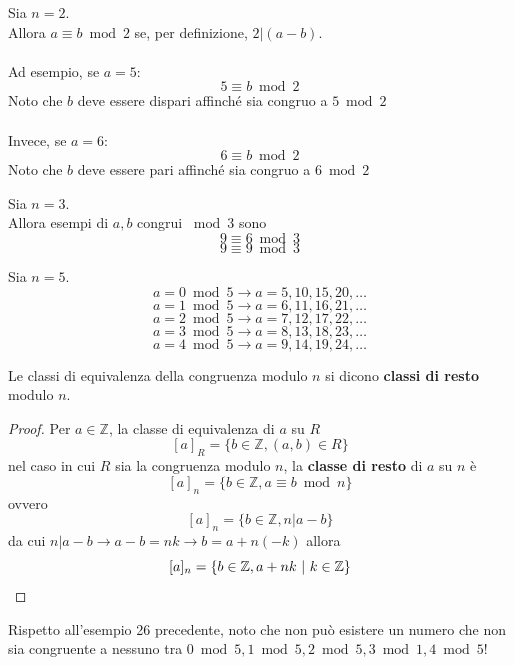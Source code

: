 \documentclass[a4paper,12pt, oneside]{book}
\begin{document}
		\begin{shaded}
			\begin{esempio}
				Sia $n=2$.\\
				Allora $a \equiv b \bmod 2$ se, per definizione, $2|(a-b)$.\\\\			
				Ad esempio, se $a=5$: $$5 \equiv b \bmod 2$$
				Noto che $b$ deve essere dispari affinché sia congruo a $5 \bmod 2$\\\\
				Invece, se $a=6$: $$6 \equiv b \bmod 2$$
				Noto che $b$ deve essere pari affinché sia congruo a $6 \bmod 2$
			\end{esempio}
			\begin{esempio}
				Sia $n = 3$.\\
				Allora esempi di $a,b$ congrui $\bmod 3$ sono
				$$9 \equiv 6 \bmod 3$$
				$$9 \equiv 9 \bmod 3$$
			\end{esempio}
			\begin{esempio}
				Sia $n = 5$.\\
				$$a = 0 \bmod 5 \longrightarrow a = 5, 10, 15, 20, \dots$$
				$$a = 1 \bmod 5 \longrightarrow a = 6, 11, 16, 21, \dots$$
				$$a = 2 \bmod 5 \longrightarrow a = 7, 12, 17, 22, \dots$$
				$$a = 3 \bmod 5 \longrightarrow a = 8, 13, 18, 23, \dots$$
				$$a = 4 \bmod 5 \longrightarrow a = 9, 14, 19, 24, \dots$$
			\end{esempio}	
		\end{shaded}
		\begin{definizione}
			Le classi di equivalenza della congruenza modulo $n$ si dicono \textbf{classi di resto} modulo $n$.
			
			\begin{proof}
				Per $a \in \mathbb{Z}$, la classe di equivalenza di $a$ su $R$\\
				$$[a]_{R} = \{ b \in \mathbb{Z}, (a,b) \in R \}$$
				nel caso in cui $R$ sia la congruenza modulo $n$, la \textbf{classe di resto} di $a$ su $n$ è
				$$[a]_n = \{ b \in \mathbb{Z}, a \equiv b \bmod n \}$$
				ovvero
				$$[a]_n = \{ b \in \mathbb{Z}, n|a-b \}$$
				da cui $n|a-b \longrightarrow a-b=nk \longrightarrow b = a+n(-k)$ allora
				$$[a]_n = \{ b \in \mathbb{Z}, a+nk \mbox{\space} | \mbox{\space} k \in \mathbb{Z}\}$$
			\end{proof}
		\end{definizione}
		\begin{nota}
			Rispetto all'esempio 26 precedente, noto che non può esistere un numero che non sia congruente a nessuno tra $0 \bmod 5, 1 \bmod 5, 2 \bmod 5, 3 \bmod 1, 4 \bmod 5$!
		\end{nota}		
\end{document}
